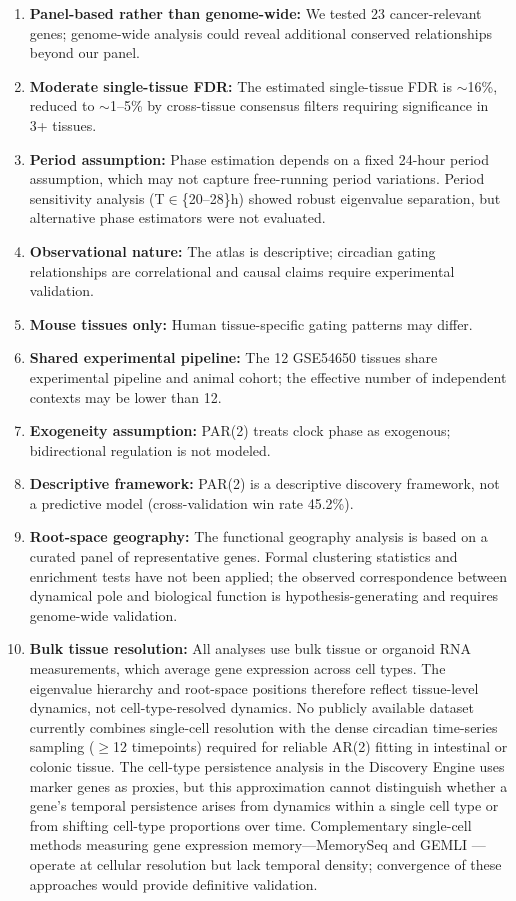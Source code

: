 \documentclass[11pt,letterpaper]{article}
\begin{document}
\begin{enumerate}[noitemsep]
    \item \textbf{Panel-based rather than genome-wide:} We tested 23 cancer-relevant genes; genome-wide analysis could reveal additional conserved relationships beyond our panel.
    \item \textbf{Moderate single-tissue FDR:} The estimated single-tissue FDR is $\sim$16\%, reduced to $\sim$1--5\% by cross-tissue consensus filters requiring significance in 3+ tissues.
    \item \textbf{Period assumption:} Phase estimation depends on a fixed 24-hour period assumption, which may not capture free-running period variations. Period sensitivity analysis (T$\in$\{20--28\}h) showed robust eigenvalue separation, but alternative phase estimators were not evaluated.
    \item \textbf{Observational nature:} The atlas is descriptive; circadian gating relationships are correlational and causal claims require experimental validation.
    \item \textbf{Mouse tissues only:} Human tissue-specific gating patterns may differ.
    \item \textbf{Shared experimental pipeline:} The 12 GSE54650 tissues share experimental pipeline and animal cohort; the effective number of independent contexts may be lower than 12.
    \item \textbf{Exogeneity assumption:} PAR(2) treats clock phase as exogenous; bidirectional regulation is not modeled.
    \item \textbf{Descriptive framework:} PAR(2) is a descriptive discovery framework, not a predictive model (cross-validation win rate 45.2\%).
    \item \textbf{Root-space geography:} The functional geography analysis is based on a curated panel of representative genes. Formal clustering statistics and enrichment tests have not been applied; the observed correspondence between dynamical pole and biological function is hypothesis-generating and requires genome-wide validation.
    \item \textbf{Bulk tissue resolution:} All analyses use bulk tissue or organoid RNA measurements, which average gene expression across cell types. The eigenvalue hierarchy and root-space positions therefore reflect tissue-level dynamics, not cell-type-resolved dynamics. No publicly available dataset currently combines single-cell resolution with the dense circadian time-series sampling ($\geq$12 timepoints) required for reliable AR(2) fitting in intestinal or colonic tissue. The cell-type persistence analysis in the Discovery Engine uses marker genes as proxies, but this approximation cannot distinguish whether a gene's temporal persistence arises from dynamics within a single cell type or from shifting cell-type proportions over time. Complementary single-cell methods measuring gene expression memory---MemorySeq \citep{raj2020memoryseq} and GEMLI \citep{eisele2024gemli}---operate at cellular resolution but lack temporal density; convergence of these approaches would provide definitive validation.
\end{enumerate}
\end{document}
